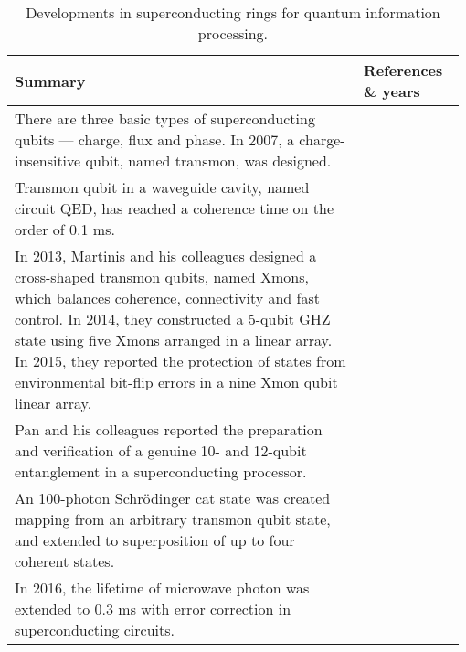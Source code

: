 \begin{table*}[!htbp]
	\begin{tabular}{|p{0.755\linewidth}|p{0.22\linewidth}|}
		\hline
		Summary & References \& years \\
		\hline \hline
		There are three basic types of superconducting qubits --- charge, flux and phase. In 2007, a charge-insensitive qubit, named transmon, was designed.  &  \cite{bib:koch2007charge} \\
		\hline
		 Transmon qubit in a waveguide cavity, named circuit QED, has reached a coherence time on the order of 0.1 ms. & \cite{bib:paik2011observation, bib:rigetti2012superconducting} \\
		\hline
		In 2013, Martinis and his colleagues designed a cross-shaped transmon qubits, named Xmons, which balances coherence, connectivity and fast control. In 2014, they constructed a 5-qubit GHZ state using five Xmons arranged in a linear array. In 2015, they reported the protection of states from environmental bit-flip errors in a nine Xmon qubit linear array. &  \cite{bib:barends2013coherent, bib:barends2014superconducting, bib:kelly2015state} \\
		\hline
		Pan and his colleagues reported the preparation and verification of a genuine 10- and 12-qubit entanglement in a superconducting processor. & \cite{bib:gong2018genuine, bib:song201710} \\		
		\hline
		An 100-photon Schr{\"o}dinger cat state was created mapping from an arbitrary transmon qubit state, and extended to superposition of up to four coherent states. & \cite{bib:vlastakis2013deterministically} \\
		\hline
		In 2016, the lifetime of microwave photon was extended to 0.3 ms with error correction in superconducting circuits. &  \cite{bib:ofek2016extending} \\
		\hline
	\end{tabular}
	\captionspacetab \caption{Developments in superconducting rings for quantum information processing.} \label{tab:superconducting}
\end{table*}

